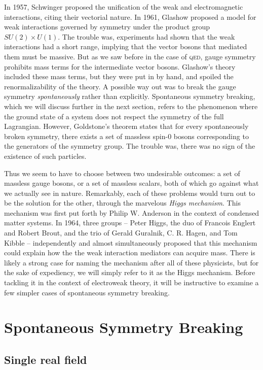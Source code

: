 In 1957, Schwinger proposed the unification of the weak and electromagnetic interactions, citing their vectorial nature. In 1961, Glashow proposed a model for weak interactions governed by symmetry under the product group $SU(2)\times U(1)$. The trouble was, experiments had shown that the weak interactions had a short range, implying that the vector bosons that mediated them must be massive. But as we saw before in the case of \textsc{qed}, gauge symmetry prohibits mass terms for the intermediate vector bosons. Glashow's theory included these mass terms, but they were put in by hand, and spoiled the renormalizability of the theory. A possible way out was to break the gauge symmetry \emph{spontaneously} rather than explicitly. Spontaneous symmetry breaking, which we will discuss further in the next section, refers to the phenomenon where the ground state of a system does not respect the symmetry of the full Lagrangian. However, Goldstone's theorem states that for every spontaneously broken symmetry, there exists a set of massless spin-0 bosons corresponding to the generators of the symmetry group. The trouble was, there was no sign of the existence of such particles. 

Thus we seem to have to choose between two undesirable outcomes: a set of massless gauge bosons, or a set of massless scalars, both of which go against what we actually see in nature. Remarkably, each of these problems would turn out to be the solution for the other, through the marvelous \emph{Higgs mechanism}. This mechanism was first put forth by Philip W. Anderson in the context of condensed matter systems. In 1964, three groups -- Peter Higgs, the duo of Francois Englert and Robert Brout, and the trio of Gerald Guralnik, C. R. Hagen, and Tom Kibble -- independently and almost simultaneously proposed that this mechanism could explain how the the weak interaction mediators can acquire mass. There is likely a strong case for naming the mechanism after all of these physicists, but for the sake of expediency, we will simply refer to it as the Higgs mechanism. Before tackling it in the context of electroweak theory, it will be instructive to examine a few simpler cases of spontaneous symmetry breaking. 

\section{Spontaneous Symmetry Breaking}

\subsection{Single real field}

